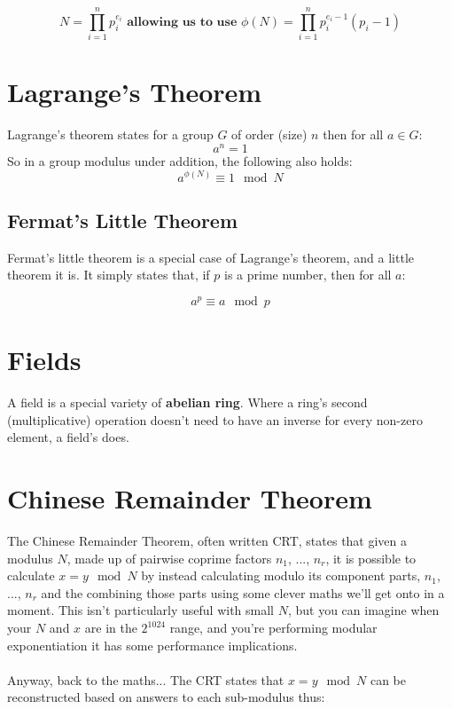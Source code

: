     $$N = \prod_{i=1}^{n}p_{i}^{e_{i}} \textbf{ allowing us to use } \phi(N) = \prod_{i=1}^{n}p_{i}^{e_{i}-1}(p_{i} - 1)$$


    \section{Lagrange's Theorem}
        Lagrange's theorem states for a group $G$ of order (size) $n$ then for all $a \in G$:
        $$a^{n} = 1$$
        So in a group modulus under addition, the following also holds: 
        $$ a^{\phi(N)} \equiv 1 \mod N$$ 
    
        \subsection{Fermat's Little Theorem}
            Fermat's little theorem is a special case of Lagrange's theorem, and a little theorem it is. It simply states that, if $p$ is a prime number, then for all $a$:

            $$ a^p \equiv a \mod p $$
        
    \section{Fields}
        A field is a special variety of \textbf{abelian ring}. Where a ring's second (multiplicative) operation doesn't need to have an inverse for every non-zero element, a field's does. 
    
    \section{Chinese Remainder Theorem}
        The Chinese Remainder Theorem, often written CRT, states that given a modulus $N$, made up of pairwise coprime factors $n_1$, ..., $n_r$, it is possible to calculate $x = y \mod N$ by instead calculating modulo its component parts, $n_1$, ..., $n_r$ and the combining those parts using some clever maths we'll get onto in a moment. This isn't particularly useful with small $N$, but you can imagine when your $N$ and $x$ are in the $2^{1024}$ range, and you're performing modular exponentiation it has some performance implications.\\
        \\
        Anyway, back to the maths... The CRT states that $x = y \mod N$ can be reconstructed based on answers to each sub-modulus thus:

